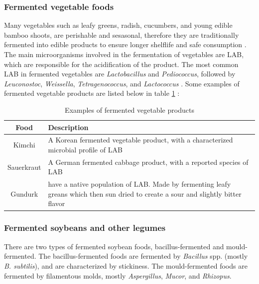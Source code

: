 \subsubsection*{Fermented vegetable foods}
Many vegetables such as leafy greens, radish, cucumbers, and young edible bamboo shoots, are perishable and sesasonal, therefore they are traditionally fermented into edible products to ensure longer shelflife and safe consumption \cite*{L1-DiversityMicro}. The main microorganisms involved in the fermentation of vegetables are LAB, which are responsible for the acidification of the product. The most common LAB in fermented vegetables are \textit{Lactobacillus} and \textit{Pediococcus}, followed by \textit{Leuconostoc}, \textit{Weissella}, \textit{Tetragenococcus}, and \textit{Lactococcus} \cite*{L1-DiversityMicro}.
Some examples of fermented vegetable products are listed below in table \ref*{tab:Fermented_vegetables} \cite*{L1-DiversityMicro}:

\begin{table}[h]
    \centering
    \caption{Examples of fermented vegetable products}
    \label{tab:Fermented_vegetables}
    \begin{tabular}{c|>{\centering\arraybackslash}m{}}
        \textbf{Food} & \textbf{Description} \\
        \hline
        Kimchi & A Korean fermented vegetable product, with a characterized microbial profile of LAB \\
        Sauerkraut & A German fermented cabbage product, with a reported species of LAB \\
        Gundurk & have a native population of LAB. Made by fermenting leafy greans which then sun dried to create a sour and slightly bitter flavor \\
    \end{tabular}
\end{table}

\subsubsection*{Fermented soybeans and other legumes}
There are two types of fermented soybean foods, bacillus-fermented and mould-fermented. The bacillus-fermented foods are fermented by \textit{Bacillus} spp. (mostly \textit{B. subtilis}), and are characterized by stickiness. The mould-fermented foods are fermented by filamentous molds, mostly \textit{Aspergillus}, \textit{Mucor}, and \textit{Rhizopus}.

